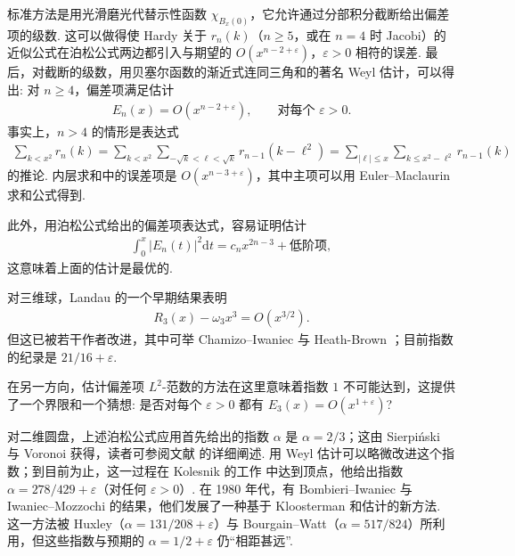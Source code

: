标准方法是用光滑磨光代替示性函数 $\chi_{B_x(0)}$，它允许通过分部积分截断给出偏差项的级数. 这可以做得使 Hardy 关于 $r_n(k)$（$n \geq 5$，或在 $n = 4$ 时 Jacobi）的近似公式在泊松公式两边都引入与期望的 $O(x^{n-2+\varepsilon})$，$\varepsilon > 0$ 相符的误差. 最后，对截断的级数，用贝塞尔函数的渐近式连同三角和的著名 Weyl 估计，可以得出: 对 $n \geq 4$，偏差项满足估计
\begin{align*}
  E_{n}(x)=O(x^{n-2+\varepsilon}),\qquad \text{对每个 } \varepsilon>0.
\end{align*}
事实上，$n > 4$ 的情形是表达式
\begin{align*}
  \sum_{k<x^{2}}r_{n}(k)
  =\sum_{k<x^{2}}\sum_{-\sqrt{k}<\ell<\sqrt{k}}r_{n-1}(k-\ell^{2})
  =\sum_{|\ell|\leq x}\sum_{k\leq x^{2}-\ell^{2}}r_{n-1}(k)
\end{align*}
的推论. 内层求和中的误差项是 $O(x^{n-3+\varepsilon})$，其中主项可以用 Euler--Maclaurin 求和公式得到.

此外，用泊松公式给出的偏差项表达式，容易证明估计
\begin{align*}
  \int_{0}^{x}\left|E_{n}(t)\right|^{2}\mathrm{d}t=c_{n}x^{2n-3}+\text{低阶项},
\end{align*}
这意味着上面的估计是最优的.

对三维球，Landau 的一个早期结果表明
\begin{align*}
  R_{3}(x)-\omega_{3}x^{3}=O(x^{3/2}).
\end{align*}
但这已被若干作者改进，其中可举 Chamizo--Iwaniec \cite{b153} 与 Heath-Brown \cite{b163}；目前指数的纪录是 $21/16 + \varepsilon$.

在另一方向，估计偏差项 $L^2$-范数的方法在这里意味着指数 $1$ 不可能达到，这提供了一个界限和一个猜想: 是否对每个 $\varepsilon > 0$ 都有 $E_3(x) = O(x^{1+\varepsilon})$?

对二维圆盘，上述泊松公式应用首先给出的指数 $\alpha$ 是 $\alpha = 2/3$；这由 Sierpiński 与 Voronoi 获得，读者可参阅文献 \cite{b151} 的详细阐述. 用 Weyl 估计可以略微改进这个指数；到目前为止，这一过程在 Kolesnik 的工作 \cite{b159} 中达到顶点，他给出指数 $\alpha = 278/429 + \varepsilon$（对任何 $\varepsilon > 0$）. 在 1980 年代，有 Bombieri--Iwaniec \cite{b148} 与 Iwaniec--Mozzochi \cite{b165} 的结果，他们发展了一种基于 Kloosterman 和估计的新方法. 这一方法被 Huxley（$\alpha = 131/208 + \varepsilon$）与 Bourgain--Watt（$\alpha = 517/824$）所利用，但这些指数与预期的 $\alpha = 1/2 + \varepsilon$ 仍``相距甚远''.


